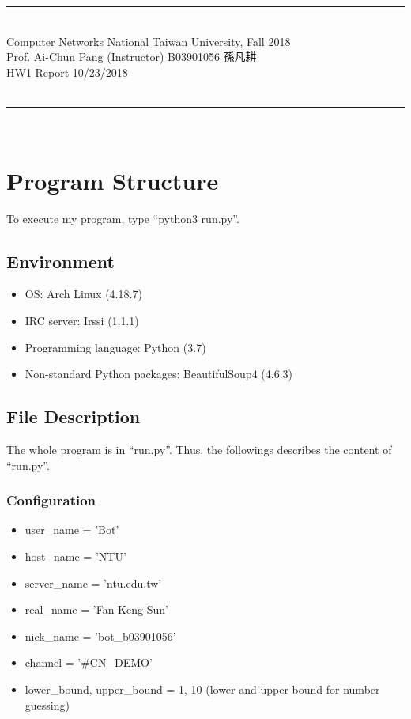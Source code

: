 \documentclass{article}
\begin{document}
{\bf \noindent
\rule[3pt]{\textwidth}{0.3pt}\\
Computer Networks \hfill National Taiwan University, Fall 2018 \\
Prof. Ai-Chun Pang (Instructor) \hfill B03901056 孫凡耕 \\
HW1 Report \hfill 10/23/2018 \\
\vspace{-20pt} \\
\rule[3pt]{\textwidth}{1.3pt}\\
[-1cm]
}


\section{Program Structure}

To execute my program, type ``python3 run.py''.

\subsection{Environment}
\begin{itemize}
  \item OS: Arch Linux (4.18.7)
  \item IRC server: Irssi (1.1.1)
  \item Programming language: Python (3.7)
  \item Non-standard Python packages: BeautifulSoup4 (4.6.3)
\end{itemize}

\subsection{File Description}
The whole program is in ``run.py''.
Thus, the followings describes the content of ``run.py''.

\subsubsection{Configuration}
\begin{itemize}
  \item user\_name = 'Bot'
  \item host\_name = 'NTU'
  \item server\_name = 'ntu.edu.tw'
  \item real\_name = 'Fan-Keng Sun'
  \item nick\_name = 'bot\_b03901056'
  \item channel = '\#CN\_DEMO'
  \item lower\_bound, upper\_bound = 1, 10 (lower and upper bound for number guessing)
\end{itemize}
\end{document}
